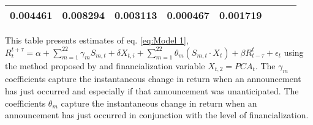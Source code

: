 \begin{sidewaystable}
{\begin{tabular}{@{}lllllllllllll@{}}
\multicolumn{2}{c}{ 0.004461 }                                                 & \multicolumn{2}{c}{ 0.008294 }                                                 & \multicolumn{2}{c}{ 0.003113 }                                                 & \multicolumn{2}{c}{ 0.000467 }                                                   & \multicolumn{2}{c}{ 0.001719 }                                                 \\ \bottomrule 
\end{tabular}
}
\begin{tablenotes}\item 
    \singlespacing
    \footnotesize
    This table presents estimates of eq. \ref{eq:Model 1}, $R_{t}^{t+\tau}=\alpha+\sum_{m=1}^{22} \gamma_m S_{m,t}+ \delta X_{t,i} + \sum_{m=1}^{22} \theta_m (S_{m,t} \cdot X_t)+\beta R_{t-\tau}^{t}+\epsilon_{t}$ using the method proposed by \citet{kurov2019price} and financialization variable $X_{t,2}=PCA_t$. The $\gamma_m$ coefficients capture the instantaneous change in return when an announcement has just occurred and especially if that announcement was unanticipated. The coefficients $\theta_m$ capture the instantaneous change in return when an announcement has just occurred in conjunction with the level of financialization.
\end{tablenotes}
\end{sidewaystable}

